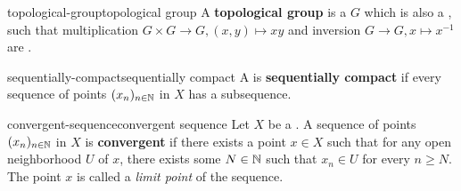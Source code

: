 \begin{topic}{topological-group}{topological group}
    A \textbf{topological group} is a  $G$ which is also a , such that multiplication $G \times G \to G, (x, y) \mapsto xy$ and inversion $G \to G, x \mapsto x^{-1}$ are .
\end{topic}

\begin{topic}{sequentially-compact}{sequentially compact}
    A  is \textbf{sequentially compact} if every sequence of points $(x_n)_{n \in \mathbb{N}}$ in $X$ has a  subsequence.
\end{topic}

\begin{topic}{convergent-sequence}{convergent sequence}
    Let $X$ be a . A sequence of points $(x_n)_{n \in \mathbb{N}}$ in $X$ is \textbf{convergent} if there exists a point $x \in X$ such that for any open neighborhood $U$ of $x$, there exists some $N \in \mathbb{N}$ such that $x_n \in U$ for every $n \ge N$. The point $x$ is called a \textit{limit point} of the sequence.
\end{topic}
